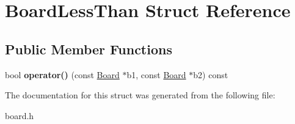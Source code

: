 \hypertarget{structBoardLessThan}{\section{\-Board\-Less\-Than \-Struct \-Reference}
\label{structBoardLessThan}
}
\subsection*{\-Public \-Member \-Functions}
\begin{DoxyCompactItemize}
\item 
\hypertarget{structBoardLessThan_a2a9b1962e86c925245c043ba85fa970a}{bool {\bfseries operator()} (const \hyperlink{classBoard}{\-Board} $\ast$b1, const \hyperlink{classBoard}{\-Board} $\ast$b2) const }\label{structBoardLessThan_a2a9b1962e86c925245c043ba85fa970a}

\end{DoxyCompactItemize}


\-The documentation for this struct was generated from the following file\-:\begin{DoxyCompactItemize}
\item 
board.\-h\end{DoxyCompactItemize}
